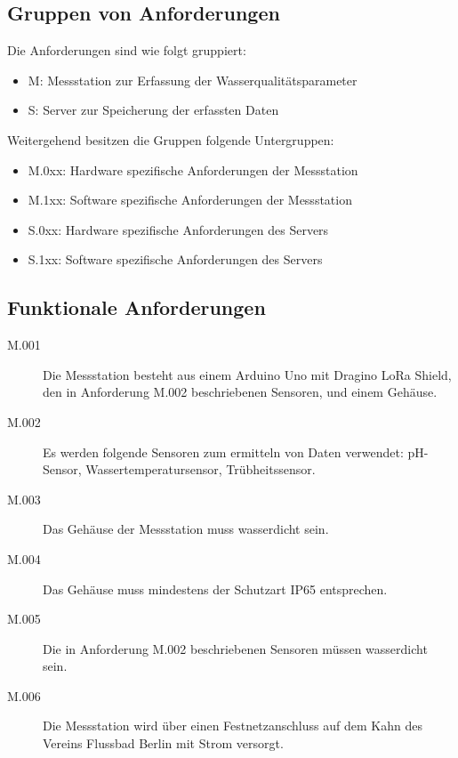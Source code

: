 \documentclass[
11pt,
a4paper,
ngerman,
]{article}
\begin{document}
\subsection{Gruppen von Anforderungen}

Die Anforderungen sind wie folgt gruppiert:
\begin{itemize}
	\item M: Messstation zur Erfassung der Wasserqualitätsparameter
	\item S: Server zur Speicherung der erfassten Daten
\end{itemize}

Weitergehend besitzen die Gruppen folgende Untergruppen:
\begin{itemize}
	\item M.0xx: Hardware spezifische Anforderungen der Messstation
	\item M.1xx: Software spezifische Anforderungen der Messstation
	\item S.0xx: Hardware spezifische Anforderungen des Servers
	\item S.1xx: Software spezifische Anforderungen des Servers
\end{itemize}

\subsection{Funktionale Anforderungen}

\begin{description}
	\item[M.001]
		Die Messstation besteht aus einem Arduino Uno mit Dragino LoRa Shield, den in
		Anforderung M.002 beschriebenen Sensoren, und einem Gehäuse.

	\item[M.002]
		Es werden folgende Sensoren zum ermitteln von Daten verwendet: pH-Sensor,
		Wassertemperatursensor, Trübheitssensor.

	\item[M.003]
		Das Gehäuse der Messstation muss wasserdicht sein.

	\item[M.004]
		Das Gehäuse muss mindestens der Schutzart IP65 entsprechen.

	\item[M.005]
		Die in Anforderung M.002 beschriebenen Sensoren müssen wasserdicht sein.

	\item[M.006]
		Die Messstation wird über einen Festnetzanschluss auf dem Kahn des Vereins
		\glqq Flussbad Berlin\grqq{} mit Strom versorgt.
\end{description}
\end{document}
